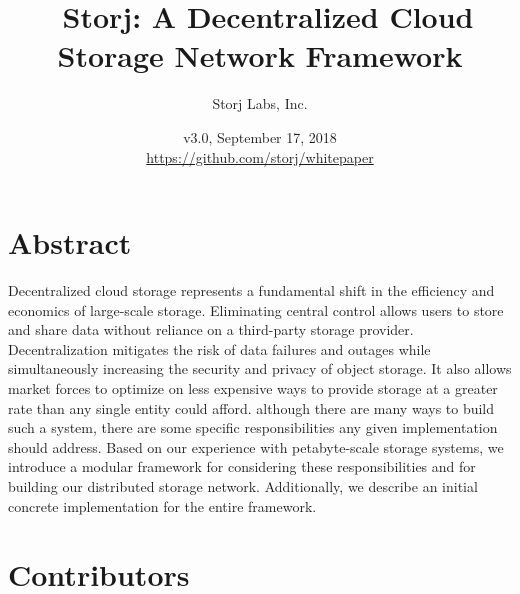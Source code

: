 \documentclass[11pt,fleqn,openany]{book}
\title{\textbf{\sffamily\color{white} \
Storj: A Decentralized Cloud Storage Network Framework}}
\author{\small\sffamily\color{white}
Storj Labs, Inc.}
\date{\small\sffamily\color{white} v3.0, September 17, 2018\\
\small\color{white}\url{https://github.com/storj/whitepaper}
}
\begin{document}
\thispagestyle{fancy}

\maketitle


\newpage

\tableofcontents\newpage

\section{Abstract}

Decentralized cloud storage represents a fundamental shift in
the efficiency and economics of large-scale storage.
Eliminating central control allows users to store and share data
without reliance on a third-party storage provider. Decentralization mitigates
the risk of data failures and outages while simultaneously increasing
the security and privacy of object storage. It also
allows market forces to optimize on less expensive ways to
provide storage at a greater rate than any single entity could afford.
although there are many ways to build such a system, there are some specific
responsibilities any given implementation should address.
Based on our experience with petabyte-scale
storage systems, we introduce a modular framework for considering these
responsibilities and for building our distributed storage network.
Additionally, we describe an initial
concrete implementation for the entire framework.

\section{Contributors}
\end{document}
